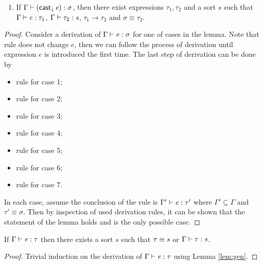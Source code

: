 \begin{lem}
\begin{enumerate}[(1)]
	\item If $\Gamma  \vdash  (  \mathsf{cast}_{\downarrow} \, \mathit{e}  )  :  \sigma$, then there exist expressions $\tau_{{\mathrm{1}}},\tau_{{\mathrm{2}}}$ and a sort $s$ such that $\Gamma  \vdash  \mathit{e}  :  \tau_{{\mathrm{1}}}$, $\Gamma  \vdash  \tau_{{\mathrm{2}}}  :  \mathit{s}$, $\tau_{{\mathrm{1}}}  \longrightarrow  \tau_{{\mathrm{2}}}$ and $\sigma  \equiv  \tau_{{\mathrm{2}}}$.
\end{enumerate}
\end{lem}

\begin{proof}
    Consider a derivation of $\Gamma  \vdash  \mathit{e}  :  \sigma$ for one of cases in the lemma. Note that rule  does not change $e$, then we can follow the process of derivation until expression $e$ is introduced the first time. The last step of derivation can be done by
    \begin{itemize}
        \item rule  for case 1;
        \item rule  for case 2;
        \item rule  for case 3;
        \item rule  for case 4;
        \item rule  for case 5;
        \item rule  for case 6;
        \item rule  for case 7.
    \end{itemize}
    In each case, assume the conclusion of the rule is $\Gamma'  \vdash  \mathit{e}  :  \tau'$ where $\Gamma' \subseteq \Gamma$ and $\tau'  \equiv  \sigma$. Then by inspection of used derivation rules, it can be shown that the statement of the lemma holds and is the only possible case.
\end{proof}

\begin{lem}\label{lem:corrtyp}
    If $\Gamma  \vdash  \mathit{e}  :  \tau$ then there exists a sort $s$ such that $\tau  \equiv  \mathit{s}$ or $\Gamma  \vdash  \tau  :  \mathit{s}$.
\end{lem}

\begin{proof}
    Trivial induction on the derivation of $\Gamma  \vdash  \mathit{e}  :  \tau$ using Lemma \ref{lem:gen}.
\end{proof}

